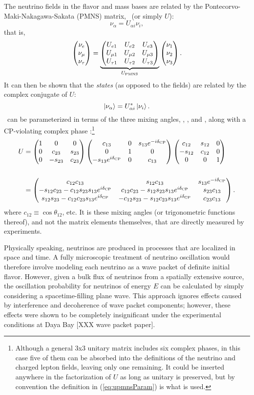 \documentclass[../thesis.tex]{subfiles}
\begin{document}
The neutrino fields in the flavor and mass bases are related by the Pontecorvo-Maki-Nakagawa-Sakata (PMNS) matrix, \upmns\ (or simply $U$):
\[\nu_\alpha = U_{\alpha i} \nu_i,\]
that is,
\[  \begin{pmatrix} {\nu_e} \\ {\nu_\mu} \\ {\nu_\tau} \end{pmatrix} = \underbrace{ \begin{pmatrix} U_{e 1} & U_{e 2} & U_{e 3} \\ U_{\mu 1} & U_{\mu 2} & U_{\mu 3} \\ U_{\tau 1} & U_{\tau 2} & U_{\tau 3} \end{pmatrix}}_{ U_\mathrm{PMNS}}  \begin{pmatrix} \nu_1 \\ \nu_2 \\ \nu_3 \end{pmatrix}. \]
It can then be shown that the \emph{states} (as opposed to the fields) are related by the complex conjugate of $U$:
\begin{equation}
  \label{eq:nuStateRel}
\ket{\nu_\alpha} = U^*_{\alpha i}\ket{\nu_i}.
\end{equation}
\upmns\ can be parameterized in terms of the three mixing angles, \tAB, \tBC, and \tAC, along with a CP-violating complex phase \dcp:\footnote{Although a general 3x3 unitary matrix includes six complex phases, in this case five of them can be absorbed into the definitions of the neutrino and charged lepton fields, leaving only one remaining. It could be inserted anywhere in the factorization of $U$ as long as unitary is preserved, but by convention the definition in (\ref{eq:upmnsParam}) is what is used.}
\begin{align}
  \label{eq:upmnsParam}
  \begin{split}
  U &=  \begin{pmatrix} 1 & 0 & 0 \\ 0 &  c_{23} &  s_{23} \\ 0 & - s_{23} &  c_{23} \end{pmatrix} \begin{pmatrix}  c_{13} & 0 &  s_{13}e^{-i\delta_\text{CP}} \\ 0 & 1 & 0 \\ - s_{13}e^{i\delta_\text{CP}} & 0 &  c_{13} \end{pmatrix} \begin{pmatrix}  c_{12} &  s_{12} & 0 \\ - s_{12} &  c_{12} & 0 \\ 0 & 0 & 1 \end{pmatrix} \\\\
    &=  \begin{pmatrix} c_{12}c_{13} & s_{12} c_{13} & s_{13}e^{-i\delta_\text{CP}} \\-s_{12}c_{23} - c_{12}s_{23}s_{13}e^{i\delta_\text{CP}} & c_{12}c_{23} - s_{12}s_{23}s_{13}e^{i\delta_\text{CP}} & s_{23}c_{13}\\s_{12}s_{23} - c_{12}c_{23}s_{13}e^{i\delta_\text{CP}} & -c_{12}s_{23} - s_{12}c_{23}s_{13}e^{i\delta_\text{CP}} & c_{23}c_{13} \end{pmatrix}.
  \end{split}
\end{align}
where $c_{12} \equiv \cos\theta_{12}$, etc.    It is these mixing angles (or trigonometric functions thereof), and not the matrix elements themselves, that are directly measured by experiments.

Physically speaking, neutrinos are produced in processes that are localized in space and time. A fully microscopic treatment of neutrino oscillation would therefore involve modeling each neutrino as a wave packet of definite initial flavor. However, given a bulk flux of neutrinos from a spatially extensive source, the oscillation probability for neutrinos of energy $E$ can be calculated by simply considering a spacetime-filling plane wave. This approach ignores effects caused by interference and decoherence of wave packet components; however, these effects were shown to be completely insignificant under the experimental conditions at Daya Bay [XXX wave packet paper].

\newcommand\nuF{\nu^{\mathrm{F}}}
\newcommand\nuM{\nu^{\mathrm{M}}}
\end{document}

